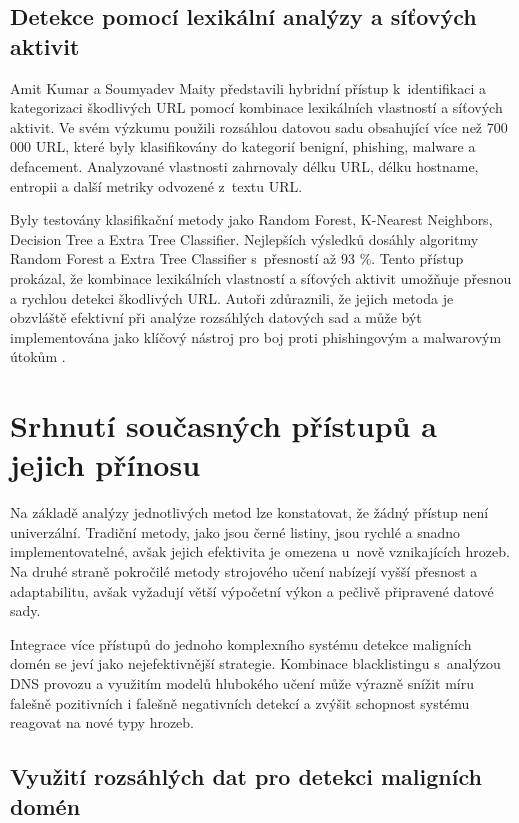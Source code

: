 \subsection{Detekce pomocí lexikální analýzy a síťových aktivit}

Amit Kumar a Soumyadev Maity představili hybridní přístup k~identifikaci a kategorizaci škodlivých URL pomocí kombinace lexikálních vlastností a síťových aktivit. Ve svém výzkumu použili rozsáhlou datovou sadu obsahující více než 700 000 URL, které byly klasifikovány do kategorií benigní, phishing, malware a defacement. Analyzované vlastnosti zahrnovaly délku URL, délku hostname, entropii a další metriky odvozené z~textu URL.

Byly testovány klasifikační metody jako Random Forest, K-Nearest Neighbors, Decision Tree a Extra Tree Classifier. Nejlepších výsledků dosáhly algoritmy Random Forest a Extra Tree Classifier s~přesností až 93 \%. Tento přístup prokázal, že kombinace lexikálních vlastností a síťových aktivit umožňuje přesnou a rychlou detekci škodlivých URL. Autoři zdůraznili, že jejich metoda je obzvláště efektivní při analýze rozsáhlých datových sad a může být implementována jako klíčový nástroj pro boj proti phishingovým a malwarovým útokům \cite{kumar}.


\section{Srhnutí současných přístupů a jejich přínosu}

Na základě analýzy jednotlivých metod lze konstatovat, že žádný přístup není univerzální. Tradiční metody, jako jsou černé listiny, jsou rychlé a snadno implementovatelné, avšak jejich efektivita je omezena u~nově vznikajících hrozeb. Na druhé straně pokročilé metody strojového učení nabízejí vyšší přesnost a adaptabilitu, avšak vyžadují větší výpočetní výkon a pečlivě připravené datové sady.

Integrace více přístupů do jednoho komplexního systému detekce maligních domén se jeví jako nejefektivnější strategie. Kombinace blacklistingu s~analýzou DNS provozu a využitím modelů hlubokého učení může výrazně snížit míru falešně pozitivních i falešně negativních detekcí a zvýšit schopnost systému reagovat na nové typy hrozeb.


\subsection{Využití rozsáhlých dat pro detekci maligních domén}


